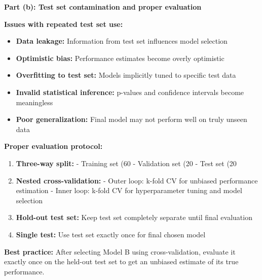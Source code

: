 \documentclass{../../common/quals-template}
\begin{document}
\begin{questions}
\begin{solution}
\textbf{Part (b): Test set contamination and proper evaluation}

\textbf{Issues with repeated test set use:}
\begin{itemize}
\item \textbf{Data leakage:} Information from test set influences model selection
\item \textbf{Optimistic bias:} Performance estimates become overly optimistic
\item \textbf{Overfitting to test set:} Models implicitly tuned to specific test data
\item \textbf{Invalid statistical inference:} p-values and confidence intervals become meaningless
\item \textbf{Poor generalization:} Final model may not perform well on truly unseen data
\end{itemize}

\textbf{Proper evaluation protocol:}
\begin{enumerate}
\item \textbf{Three-way split:}
   - Training set (60%
   - Validation set (20%
   - Test set (20%

\item \textbf{Nested cross-validation:}
   - Outer loop: k-fold CV for unbiased performance estimation
   - Inner loop: k-fold CV for hyperparameter tuning and model selection

\item \textbf{Hold-out test set:} Keep test set completely separate until final evaluation

\item \textbf{Single test:} Use test set exactly once for final chosen model
\end{enumerate}

\textbf{Best practice:} After selecting Model B using cross-validation, evaluate it exactly once on the held-out test set to get an unbiased estimate of its true performance.
\end{solution}

\end{questions}
\end{document}
